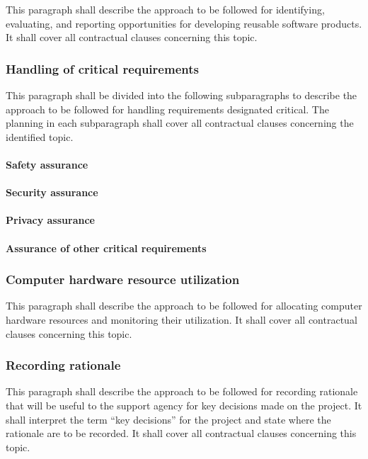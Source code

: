 \documentclass{fidata-report-template}
\begin{document}
This paragraph shall describe the approach to be followed for
identifying, evaluating, and reporting opportunities for developing
reusable software products. It shall cover all contractual clauses
concerning this topic.

\subsubsection{Handling of critical requirements}

This paragraph shall be divided into the following subparagraphs to
describe the approach to be followed for handling requirements
designated critical. The planning in each subparagraph shall cover all
contractual clauses concerning the identified topic.

\paragraph{Safety assurance}

\paragraph{Security assurance}

\paragraph{Privacy assurance}

\paragraph{Assurance of other critical requirements}

\subsubsection{Computer hardware resource utilization}

This paragraph shall describe the approach to be followed for allocating
computer hardware resources and monitoring their utilization. It shall
cover all contractual clauses concerning this topic.

\subsubsection{Recording rationale}

This paragraph shall describe the approach to be followed for recording
rationale that will be useful to the support agency for key decisions
made on the project. It shall interpret the term ``key decisions'' for
the project and state where the rationale are to be recorded. It shall
cover all contractual clauses concerning this topic.
\end{document}
